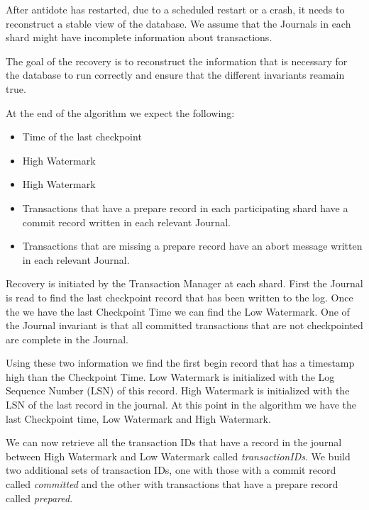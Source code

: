 \documentclass[twoside]{article}
\begin{document}
After antidote has restarted, due to a scheduled restart or a crash, it needs to 
reconstruct a stable view of the database. We assume that the Journals in each 
shard might have incomplete information about transactions. 

The goal of the recovery is to reconstruct the information that is necessary for 
the database to run correctly and ensure that the different invariants reamain true.


At the end of the algorithm we expect the following:
\begin{itemize}
  \item Time of the last checkpoint
  \item High Watermark
  \item High Watermark
  \item Transactions that have a prepare record in each participating shard have a commit record written in each relevant Journal.
  \item Transactions that are missing a prepare record have an abort message written in each relevant Journal.
\end{itemize}

Recovery is initiated by the Transaction Manager at each shard. 
First the Journal is read to find the last checkpoint record that has been written to the log. 
Once the we have the last Checkpoint Time we can find the Low Watermark.
One of the Journal invariant is that all committed transactions that are not checkpointed are complete in the Journal.

Using these two information we find the first begin record that has a timestamp high than the Checkpoint Time.
Low Watermark is initialized with the Log Sequence Number (LSN) of this record. 
High Watermark is initialized with the LSN of the last record in the journal.
At this point in the algorithm we have the last Checkpoint time, Low Watermark and High Watermark.

We can now retrieve all the transaction IDs that have a record in the journal between High Watermark and Low Watermark called \textit{transactionIDs}.
We build two additional sets of transaction IDs, one with those with a commit record called \textit{committed} and the other with transactions that have a prepare record called \textit{prepared}.
\end{document}
